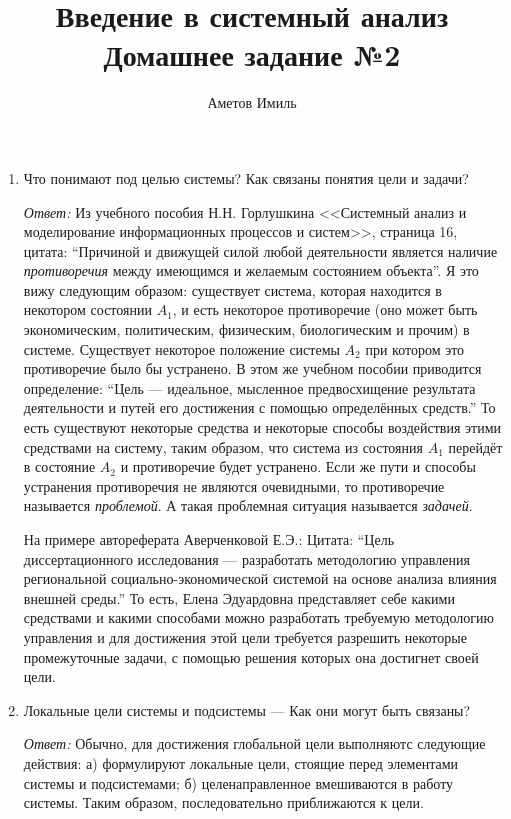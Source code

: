 \documentclass[10pt]{article}
\author{Аметов Имиль}
\title{Введение в системный анализ \\ Домашнее задание №2}
\begin{document}
\maketitle

\begin{enumerate}
\item{Что понимают под целью системы? Как связаны понятия цели и задачи?}

  \emph{Ответ:} Из учебного пособия Н.Н. Горлушкина <<Системный анализ и моделирование информационных процессов и систем>>, страница 16, цитата: ``Причиной и движущей силой любой деятельности является наличие \emph{противоречия} между имеющимся и желаемым состоянием объекта''. Я это вижу следующим образом: существует система, которая находится в некотором состоянии $A_1$, и есть некоторое противоречие (оно может быть экономическим, политическим, физическим, биологическим и прочим) в системе. Существует некоторое положение системы $A_2$ при котором это противоречие было бы устранено. В этом же учебном пособии приводится определение: ``Цель --- идеальное, мысленное предвосхищение результата деятельности и путей его достижения с помощью определённых средств.'' То есть существуют некоторые средства и некоторые способы воздействия этими средствами на систему, таким образом, что система из состояния $A_1$ перейдёт в состояние $A_2$ и противоречие будет устранено. Если же пути и способы устранения противоречия не являются очевидными, то противоречие называется \emph{проблемой}. А такая проблемная ситуация называется \emph{задачей}.

  На примере автореферата Аверченковой Е.Э.: Цитата: ``Цель диссертационного исследования --- разработать методологию управления региональной социально-экономической системой на основе анализа влияния внешней среды.'' То есть, Елена Эдуардовна представляет себе какими средствами и какими способами можно разработать требуемую методологию управления и для достижения этой цели требуется разрешить некоторые промежуточные задачи, с помощью решения которых она достигнет своей цели.
  
\item{Локальные цели системы и подсистемы --- Как они могут быть связаны?}

  \emph{Ответ:} Обычно, для достижения глобальной цели выполняютс следующие действия: а) формулируют локальные цели, стоящие перед элементами системы и подсистемами; б) целенаправленное вмешиваются в работу системы. Таким образом, последовательно приближаются к цели.
  

\end{enumerate}
\end{document}
